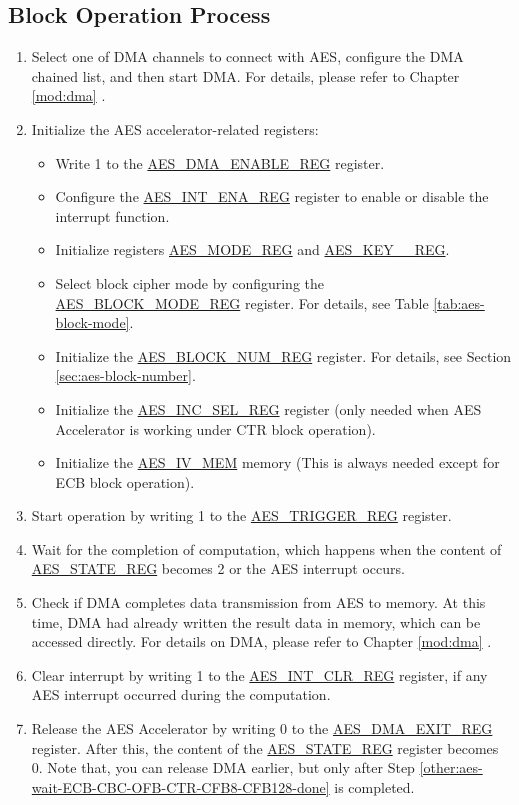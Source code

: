 \documentclass[main\_\_EN.tex]{subfiles}
\begin{document}
\subsection{Block Operation Process}
\begin{enumerate}
    \item Select one of DMA channels to connect with AES, configure the DMA chained list, and then start DMA. For details, please refer to Chapter \ref{mod:dma} \textit{}.
    \item Initialize the AES accelerator-related registers:
    \begin{itemize}
        \item Write 1 to the \hyperref[regdesc:AESDMAENABLEREG]{AES\_DMA\_ENABLE\_REG} register.
        \item Configure the \hyperref[regdesc:AESINTENAREG]{AES\_INT\_ENA\_REG} register to enable or disable the interrupt function.
        \item Initialize registers \hyperref[regdesc:AESMODEREG]{AES\_MODE\_REG} and \hyperref[regdesc:AESKEYnREG]{AES\_KEY\_\_REG}.
        \item Select block cipher mode by configuring the \hyperref[regdesc:AESBLOCKMODEREG]{AES\_BLOCK\_MODE\_REG} register. For details, see Table \ref{tab:aes-block-mode}.
        \item Initialize the \hyperref[regdesc:AESBLOCKNUMREG]{AES\_BLOCK\_NUM\_REG} register. For details, see Section \ref{sec:aes-block-number}.
        \item Initialize the \hyperref[regdesc:AESINCSELREG]{AES\_INC\_SEL\_REG} register (only needed when AES Accelerator is working under CTR block operation).
        \item Initialize the \hyperref[memdesc:AESIVMEM]{AES\_IV\_MEM} memory (This is always needed except for ECB block operation).
    \end{itemize}
    \item Start operation by writing 1 to the \hyperref[regdesc:AESTRIGGERREG]{AES\_TRIGGER\_REG} register.
    \item \label{other:aes-wait-ECB-CBC-OFB-CTR-CFB8-CFB128-done}
            Wait for the completion of computation, which happens when the content of \hyperref[regdesc:AESSTATEREG]{AES\_STATE\_REG} becomes 2 or the AES interrupt occurs.
    \item Check if DMA completes data transmission from AES to memory. At this time, DMA had already written the result data in memory, which can be accessed directly. For details on DMA, please refer to Chapter \ref{mod:dma} \textit{}.
    \item Clear interrupt by writing 1 to the \hyperref[regdesc:AESINTCLRREG]{AES\_INT\_CLR\_REG} register, if any AES interrupt occurred during the computation.
    \item Release the AES Accelerator by writing 0 to the \hyperref[regdesc:AESDMAEXITREG]{AES\_DMA\_EXIT\_REG} register. After this, the content of the \hyperref[regdesc:AESSTATEREG]{AES\_STATE\_REG} register becomes 0.
    Note that, you can release DMA earlier, but only after Step \ref{other:aes-wait-ECB-CBC-OFB-CTR-CFB8-CFB128-done} is completed.
\end{enumerate}
\end{document}
